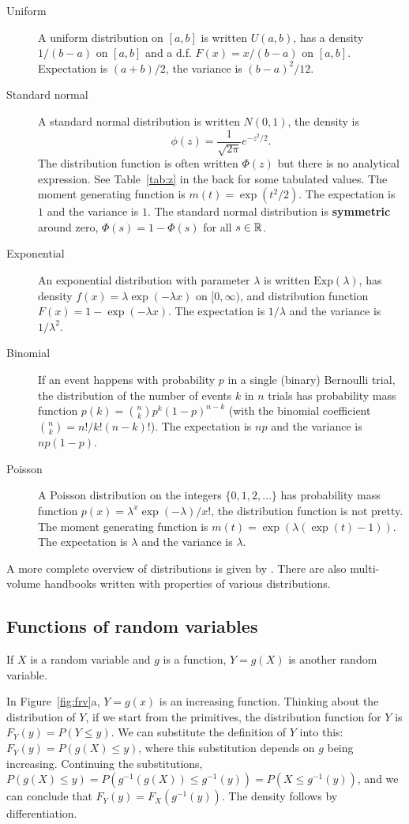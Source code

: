 \documentclass[twoside]{article}
\begin{document}
\begin{description}
\item[Uniform] A uniform distribution on $[a,b]$ is written $U(a,b)$, has a density $1/(b-a)$ on $[a,b]$ and 
a d.f. $F(x)=x/(b-a)$ on $[a,b]$. Expectation is $(a+b)/2$, the variance is $(b-a)^2/12$. 
\item[Standard normal] A standard normal distribution is written $N(0,1)$,  the density is 
\[ \phi(z) = \frac{1}{\sqrt{2\pi}} e^{-z^2/2}.\] The distribution function is often written $\Phi(z)$ but
there is no analytical expression. See Table~\ref{tab:z} in the back for some tabulated values.
The moment generating function is $m(t) = \exp(t^2/2)$. The expectation is $1$ and the variance is $1$. The 
standard normal distribution is \textbf{symmetric} around zero, $\Phi(s)=1-\Phi(s)$ for all $s\in\mathbb{R}$.
\item[Exponential] An exponential distribution with parameter $\lambda$ is written $\mathrm{Exp}(\lambda)$, 
has density $f(x)=\lambda \exp(-\lambda  x)$ on $[0,\infty)$, and distribution function $F(x)=1- \exp(-\lambda x)$.
The expectation is $1/\lambda$ and the variance is $1/\lambda^2$.
\item[Binomial] If an event happens with probability $p$ in a single (binary)
Bernoulli trial, the distribution of the number of events $k$ in $n$ trials has
probability mass function $p(k) = \binom{n}{k} p^k (1-p)^{n-k}$ (with the
binomial coefficient $\binom{n}{k} = n!/k!(n-k)!$). The expectation is $n p$ and the variance is $n p(1-p)$.
\item[Poisson] A Poisson distribution on the integers $\{0,1,2,\dots\}$ has probability mass function 
$p(x) = \lambda^x \exp(-\lambda)/x!$, the distribution function is not pretty. The moment generating function
is $m(t) = \exp(\lambda( \exp(t) -1))$. The expectation is $\lambda$ and the variance is $\lambda$.
\end{description}

A more complete overview of distributions is given by \citet{Leemis2008}. There are also multi-volume
handbooks written with properties of various distributions. 

\subsection{Functions of random variables}
If $X$ is a random variable and $g$ is a function, $Y=g(X)$ is another random variable.

In Figure~\ref{fig:frv}a, $Y=g(x)$ is an increasing function. 
Thinking about the distribution of $Y$, if we start from the primitives,
the distribution function for $Y$ is $F_Y(y) = P(Y\leq y)$. We can substitute
the definition of $Y$ into this: $F_Y(y) = P(g(X)\leq y)$, where this
substitution depends on $g$ being increasing. Continuing
the substitutions, $P(g(X) \leq y) = P( g^{-1}(g(X)) \leq g^{-1}(y)) = P(X\leq g^{-1}(y))$,
and we can conclude that $F_Y(y)= F_X(g^{-1}(y))$. The density follows by differentiation.
\end{document}
